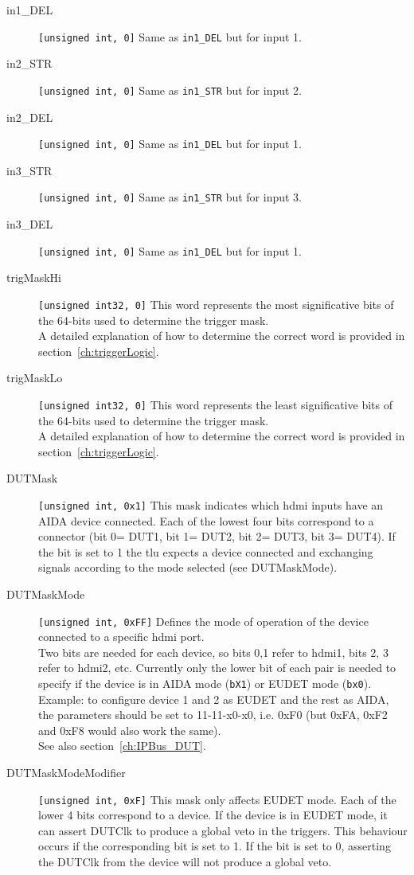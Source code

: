 \begin{description}
  \item[in1\_DEL] \verb|[unsigned int, 0]| Same as \texttt{in1\_DEL} but for input 1.
  \item[in2\_STR] \verb|[unsigned int, 0]| Same as \texttt{in1\_STR} but for input 2.
  \item[in2\_DEL] \verb|[unsigned int, 0]| Same as \texttt{in1\_DEL} but for input 1.
  \item[in3\_STR] \verb|[unsigned int, 0]| Same as \texttt{in1\_STR} but for input 3.
  \item[in3\_DEL] \verb|[unsigned int, 0]| Same as \texttt{in1\_DEL} but for input 1.
  \item[trigMaskHi] \verb|[unsigned int32, 0]| This word represents the most significative bits of the 64-bits used to determine the trigger mask.\\
        A detailed explanation of how to determine the correct word is provided in section~\ref{ch:triggerLogic}.
  \item[trigMaskLo] \verb|[unsigned int32, 0]| This word represents the least significative bits of the 64-bits used to determine the trigger mask.\\
        A detailed explanation of how to determine the correct word is provided in section~\ref{ch:triggerLogic}.
  \item[DUTMask]  \verb|[unsigned int, 0x1]| This mask indicates which \gls{hdmi} inputs have an AIDA device connected. Each of the lowest four bits correspond to a connector (bit 0= DUT1, bit 1= DUT2, bit 2= DUT3, bit 3= DUT4). If the bit is set to 1 the \gls{tlu} expects a device connected and exchanging signals according to the mode selected (see DUTMaskMode).
  \item[DUTMaskMode]  \verb|[unsigned int, 0xFF]| Defines the mode of operation of the device connected to a specific \gls{hdmi} port.\\
        Two bits are needed for each device, so bits 0,1 refer to \gls{hdmi}1, bits 2, 3 refer to \gls{hdmi}2, etc. Currently only the lower bit of each pair is needed to specify if the device is in AIDA mode (\texttt{bX1}) or EUDET mode (\texttt{bx0}).\\
        Example: to configure device 1 and 2 as EUDET and the rest as AIDA, the parameters should be set to 11-11-x0-x0, i.e. 0xF0 (but 0xFA, 0xF2 and 0xF8 would also work the same).\\
        See also section~\ref{ch:IPBus_DUT}.
  \item[DUTMaskModeModifier] \verb|[unsigned int, 0xF]| This mask only affects EUDET mode. Each of the lower 4 bits correspond to a device. If the device is in EUDET mode, it can assert DUTClk to produce a global veto in the triggers. This behaviour occurs if the corresponding bit is set to 1. If the bit is set to 0, asserting the DUTClk from the device will not produce a global veto.

\end{description}
